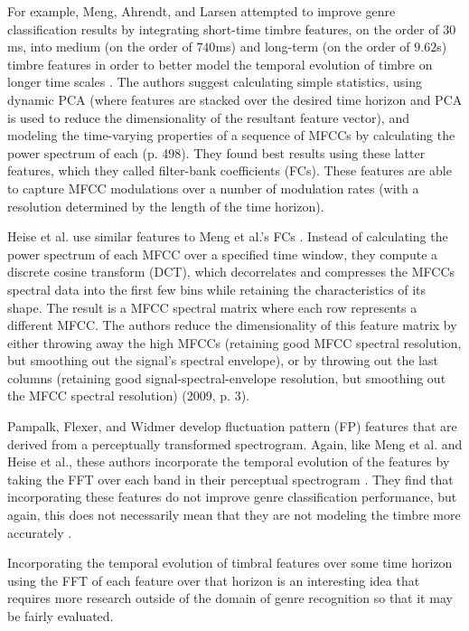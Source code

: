 \documentclass[12pt]{report} 	%
\numberwithin{figure}{chapter}
\numberwithin{table}{chapter}
\numberwithin{equation}{chapter}
\begin{document}
\begin{flushleft}
For example, Meng, Ahrendt, and Larsen attempted to improve genre classification results by integrating short-time timbre features, on the order of $30$ms, into medium (on the order of $740$ms) and long-term (on the order of $9.62$s) timbre features in order to better model the temporal evolution of timbre on longer time scales \cite[p. 498]{Meng:2005fx}. The authors suggest calculating simple statistics, using dynamic PCA (where features are stacked over the desired time horizon and PCA is used to reduce the dimensionality of the resultant feature vector), and modeling the time-varying properties of a sequence of MFCCs by calculating the power spectrum of each (p. 498). They found best results using these latter features, which they called filter-bank coefficients (FCs). These features are able to capture MFCC modulations over a number of modulation rates (with a resolution determined by the length of the time horizon). 

Heise et al. use similar features to Meng et al.'s FCs \cite{Heise:2009sp}. Instead of calculating the power spectrum of each MFCC over a specified time window, they compute a discrete cosine transform (DCT), which decorrelates and compresses the MFCCs spectral data into the first few bins while retaining the characteristics of its shape. The result is a MFCC spectral matrix where each row represents a different MFCC. The authors reduce the dimensionality of this feature matrix by either throwing away the high MFCCs (retaining good MFCC spectral resolution, but smoothing out the signal's spectral envelope), or by throwing out the last columns (retaining good signal-spectral-envelope resolution, but smoothing out the MFCC spectral resolution) (2009, p. 3).

Pampalk, Flexer, and Widmer develop fluctuation pattern (FP) features that are derived from a perceptually transformed spectrogram. Again, like Meng et al. and Heise et al., these authors incorporate the temporal evolution of the features by taking the FFT over each band in their perceptual spectrogram \cite[p. 4]{Pampalk:2005ix}. They find that incorporating these features do not improve genre classification performance, but again, this does not necessarily mean that they are not modeling the timbre more accurately \cite[p. 8]{Pampalk:2005ix}.

Incorporating the temporal evolution of timbral features over some time horizon using the FFT of each feature over that horizon is an interesting idea that requires more research outside of the domain of genre recognition so that it may be fairly evaluated.


\end{flushleft}
\end{document}
